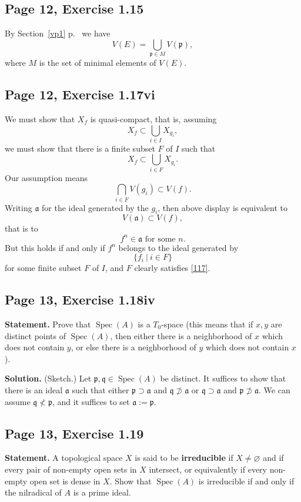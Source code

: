 \documentclass[parskip=half,fontsize=12pt]{scrartcl}%
\newcommand{\mf}{\mathfrak}
\newcommand{\aaa}{\mf a}
\newcommand{\ppp}{\mf p}
\newcommand{\qqq}{\mf q}
\newcommand{\Spec}{\operatorname{Spec}}\newcommand{\Sp}{\operatorname{Spec}}
\begin{document}
\subsection{Page 12, Exercise 1.15}\label{vp2}%

By Section~\ref{vp1} p.~\pageref{vp1} we have 
$$
V(E)=\bigcup_{\ppp\in M}V(\ppp),
$$ 
where $M$ is the set of minimal elements of $V(E)$.

\subsection{Page 12, Exercise 1.17vi}%

We must show that $X_f$ is quasi-compact, that is, assuming 
$$
X_f\subset\bigcup_{i\in I}X_{g_i},
$$ 
we must show that there is a finite subset $F$ of $I$ such that 
\begin{equation}\label{117}
X_f\subset\bigcup_{i\in F}X_{g_i}.
\end{equation}
Our assumption means 
$$
\bigcap_{i\in F}V(g_i)\subset V(f).
$$ 
Writing $\aaa$ for the ideal generated by the $g_i$, then above display is equivalent to 
$$
V(\aaa)\subset V(f),
$$ 
that is to 
$$
f^n\in\aaa\text{ for some } n.
$$ 
But this holds if and only if $f^n$ belongs to the ideal generated by 
$$
\{f_i\ |\ i\in F\}
$$ 
for some finite subset $F$ of $I$, and $F$ clearly satisfies \eqref{117}.

\subsection{Page 13, Exercise 1.18iv}%

\textbf{Statement.} Prove that $\Spec(A)$ is a $T_0$-space (this means that if $x,y$ are distinct points of $\Spec(A)$, then either there is a neighborhood of $x$ which does not contain $y$, or else there is a neighborhood of $y$ which does not contain $x$).

\textbf{Solution.} (Sketch.) Let $\ppp,\qqq\in\Spec(A)$ be distinct. It suffices to show that there is an ideal $\aaa$ such that either $\ppp\supset\aaa$ and $\qqq\not\supset\aaa$ or $\qqq\supset\aaa$ and $\ppp\not\supset\aaa$. We can assume $\qqq\not<\ppp$, and it suffices to set $\aaa:=\ppp$.

\subsection{Page 13, Exercise 1.19}\label{irr}%

\textbf{Statement.} A topological space $X$ is said to be \textbf{irreducible} if $X\ne\varnothing$ and if every pair of non-empty open sets in $X$ intersect, or equivalently if every non-empty open set is dense in $X$. Show that $\Spec(A)$ is irreducible if and only if the nilradical of $A$ is a prime ideal.
\end{document}
